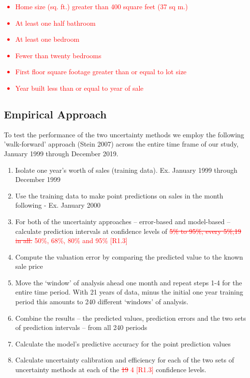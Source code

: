 \documentclass[colTwo]{anon}
\theoremstyle{definition}
\begin{document}
\textcolor{red}{
\begin{itemize}
\item Home size (sq. ft.) greater than 400 square feet (37 sq m.)
\item At least one half bathroom
\item At least one bedroom
\item Fewer than twenty bedrooms
\item First floor square footage greater than or equal to lot size
\item Year built less than or equal to year of sale 
\end{itemize}
}

\subsection{Empirical Approach}

To test the performance of the two uncertainty methods we employ the following 'walk-forward' approach (Stein 2007) across the entire time frame of our study, January 1999 through December 2019. 

\begin{enumerate}
\item Isolate one year’s worth of sales (training data). Ex. January 1999 through December 1999
\item Use the training data to make point predictions on sales in the month following - Ex. January 2000
\item For both of the uncertainty approaches -- error-based and model-based -- calculate prediction intervals at confidence levels of 
\textcolor{red}{\st{5\% to 95\%, every 5\%,{19} in all.} 50\%, 68\%, 80\% and 95\% [R1.3]} 
\item Compute the valuation error by comparing the predicted value to the known sale price
\item Move the ‘window’ of analysis ahead one month and repeat steps 1-4 for the entire time period.  With 21 years of data, minus the initial one year training period this amounts to 240 different ‘windows’ of analysis.
\item Combine the results -- the predicted values, prediction errors and the two sets of prediction intervals -- from all 240 periods
\item Calculate the model’s predictive accuracy for the point prediction values
\item Calculate uncertainty calibration and efficiency for each of the two sets of uncertainty methods at each of the \textcolor{red}{\st{19} 4 [R1.3]} confidence levels.
\end{enumerate}
\end{document}

